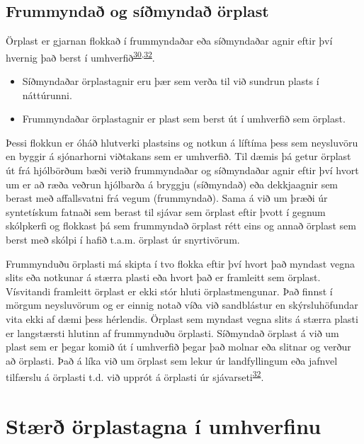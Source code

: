 \documentclass[icelandic,]{book}
\begin{document}
\hypertarget{frummynda-og-simynda-orplast}{%
\subsection*{Frummyndað og síðmyndað örplast}\label{frummynda-og-simynda-orplast}}

Örplast er gjarnan flokkað í frummyndaðar eða síðmyndaðar agnir eftir því hvernig það berst í umhverfið\textsuperscript{\protect\hyperlink{ref-boucher2017primary}{30},\protect\hyperlink{ref-sundt2014sources}{32}}.

\begin{itemize}
\item
  Síðmyndaðar örplastagnir eru þær sem verða til við sundrun plasts í náttúrunni.
\item
  Frummyndaðar örplastagnir er plast sem berst út í umhverfið sem örplast.
\end{itemize}

Þessi flokkun er óháð hlutverki plastsins og notkun á líftíma þess sem neysluvöru en byggir á sjónarhorni viðtakans sem er umhverfið. Til dæmis þá getur örplast út frá hjólbörðum bæði verið frummyndaðar og síðmyndaðar agnir eftir því hvort um er að ræða veðrun hjólbarða á bryggju (síðmyndað) eða dekkjaagnir sem berast með affallsvatni frá vegum (frummyndað). Sama á við um þræði úr syntetískum fatnaði sem berast til sjávar sem örplast eftir þvott í gegnum skólpkerfi og flokkast þá sem frummyndað örplast rétt eins og annað örplast sem berst með skólpi í hafið t.a.m. örplast úr snyrtivörum.

Frummynduðu örplasti má skipta í tvo flokka eftir því hvort það myndast vegna slits eða notkunar á stærra plasti eða hvort það er framleitt sem örplast. Vísvitandi framleitt örplast er ekki stór hluti örplastmengunar. Það finnst í mörgum neysluvörum og er einnig notað víða við sandblástur en skýrsluhöfundar vita ekki af dæmi þess hérlendis. Örplast sem myndast vegna slits á stærra plasti er langstærsti hlutinn af frummynduðu örplasti. Síðmyndað örplast á við um plast sem er þegar komið út í umhverfið þegar það molnar eða slitnar og verður að örplasti. Það á líka við um örplast sem lekur úr landfyllingum eða jafnvel tilfærslu á örplasti t.d. við upprót á örplasti úr sjávarseti\textsuperscript{\protect\hyperlink{ref-sundt2014sources}{32}}.

\hypertarget{str-orplastagna-i-umhverfinu}{%
\section*{Stærð örplastagna í umhverfinu}\label{str-orplastagna-i-umhverfinu}}
\end{document}

